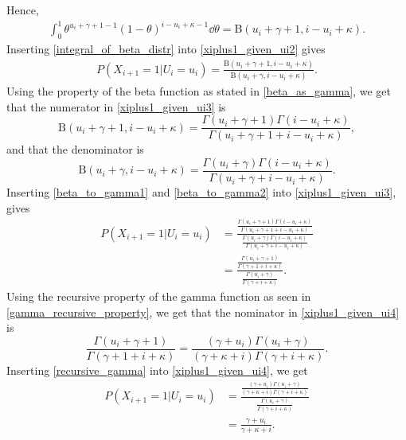 Hence,
\begin{equation}
\label{integral_of_beta_distr}
    \begin{aligned}
        \int_0^1 \theta^{u_i+\gamma+1-1}(1-\theta)^{i-u_i+\kappa-1} \dd \theta = \text{B}(u_i+\gamma+1,i-u_i+\kappa).
    \end{aligned}
\end{equation}
Inserting \eqref{integral_of_beta_distr} into \eqref{xiplus1_given_ui2} gives
\begin{equation}
\label{xiplus1_given_ui3}
    \begin{aligned}
        P(X_{i+1}=1|U_i=u_i) 
        = \frac{\text{B}(u_i+\gamma+1,i-u_i+\kappa)}
        {\text{B}(u_i+\gamma,i-u_i+\kappa)}.
    \end{aligned}
\end{equation}
Using the property of the beta function as stated in \eqref{beta_as_gamma}, we get that the numerator in \eqref{xiplus1_given_ui3} is
\begin{equation}
\label{beta_to_gamma1}
     \text{B}(u_i+\gamma+1,i-u_i+\kappa)
     =\frac{\Gamma(u_i+\gamma+1)\Gamma(i-u_i+\kappa)}{\Gamma(u_i+\gamma+1+i-u_i+\kappa)},
\end{equation}
and that the denominator is
\begin{equation}
\label{beta_to_gamma2}
    \text{B}(u_i+\gamma,i-u_i+\kappa)
    =\frac{\Gamma(u_i+\gamma)\Gamma(i-u_i+\kappa)}{\Gamma(u_i+\gamma+i-u_i+\kappa)}.
\end{equation}
Inserting \eqref{beta_to_gamma1} and \eqref{beta_to_gamma2} into \eqref{xiplus1_given_ui3}, gives
\begin{equation}
\label{xiplus1_given_ui4}
    \begin{aligned}
        P(X_{i+1}=1|U_i=u_i) 
        &= \frac{\frac{\Gamma(u_i+\gamma+1)\Gamma(i-u_i+\kappa)}{\Gamma(u_i+\gamma+1+i-u_i+\kappa)}}
        {\frac{\Gamma(u_i+\gamma)\Gamma(i-u_i+\kappa)}{\Gamma(u_i+\gamma+i-u_i+\kappa)}} \\[6pt]
        &= \frac{\frac{\Gamma(u_i+\gamma+1)}{\Gamma(\gamma+1+i+\kappa)}}
        {\frac{\Gamma(u_i+\gamma)}{\Gamma(\gamma+i+\kappa)}}.
    \end{aligned}
\end{equation}
Using the recursive property of the gamma function as seen in \eqref{gamma_recursive_property}, we get that the nominator in \eqref{xiplus1_given_ui4} is
\begin{equation}
\label{recursive_gamma}
    \frac{\Gamma(u_i+\gamma+1)}{\Gamma(\gamma+1+i+\kappa)}
    =\frac{(\gamma+u_i)\Gamma(u_i+\gamma)}{(\gamma+\kappa+i)\Gamma(\gamma+i+\kappa)}.
\end{equation}
Inserting \eqref{recursive_gamma} into \eqref{xiplus1_given_ui4}, we get
\begin{equation}
\label{xiplus1_given_ui5}
    \begin{aligned}
        P(X_{i+1}=1|U_i=u_i) 
        &= \frac{\frac{(\gamma+u_i)\Gamma(u_i+\gamma)}{(\gamma+\kappa+i)\Gamma(\gamma+i+\kappa)}}
        {\frac{\Gamma(u_i+\gamma)}{\Gamma(\gamma+i+\kappa)}}\\[6pt]
        &=\frac{\gamma+u_i}
        {\gamma+\kappa+i}.
    \end{aligned}
\end{equation}

